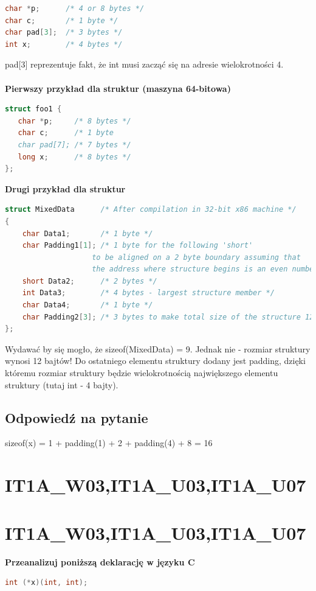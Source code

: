 \begin{lstlisting}[language=c]
char *p;      /* 4 or 8 bytes */
char c;       /* 1 byte */
char pad[3];  /* 3 bytes */
int x;        /* 4 bytes */
\end{lstlisting}
pad[3] reprezentuje fakt, że int musi zacząć się na adresie wielokrotności 4. \\\\
\textbf{Pierwszy przykład dla struktur (maszyna 64-bitowa)}
\begin{lstlisting}[language=c]
struct foo1 {
   char *p;     /* 8 bytes */
   char c;      /* 1 byte
   char pad[7]; /* 7 bytes */
   long x;      /* 8 bytes */
};
\end{lstlisting}
\textbf{Drugi przykład dla struktur}
\begin{lstlisting}[language=c]
struct MixedData      /* After compilation in 32-bit x86 machine */
{
    char Data1;       /* 1 byte */
    char Padding1[1]; /* 1 byte for the following 'short'
	                to be aligned on a 2 byte boundary assuming that
	                the address where structure begins is an even number */
    short Data2;      /* 2 bytes */
    int Data3;        /* 4 bytes - largest structure member */
    char Data4;       /* 1 byte */
    char Padding2[3]; /* 3 bytes to make total size of the structure 12 bytes */
};
\end{lstlisting}
Wydawać by się mogło, że sizeof(MixedData) = 9. Jednak nie - rozmiar struktury wynosi 12 bajtów! Do ostatniego elementu struktury dodany jest padding, dzięki któremu rozmiar struktury będzie wielokrotnością największego elementu struktury (tutaj int - 4 bajty).

\subsection{Odpowiedź na pytanie} 
sizeof(x) = 1 + padding(1) + 2 + padding(4) + 8 = 16 


\section{IT1A\_W03,IT1A\_U03,IT1A\_U07}


\section{IT1A\_W03,IT1A\_U03,IT1A\_U07} 
\textbf{Przeanalizuj poniższą deklarację w języku C}
\begin{lstlisting}[language=c]
int (*x)(int, int);
\end{lstlisting}


